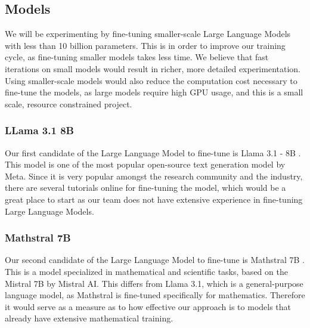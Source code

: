


\subsection{Models}
We will be experimenting by fine-tuning smaller-scale Large Language Models with less than 10 billion parameters. This is in order to improve our training cycle, as fine-tuning smaller models takes less time. We believe that fast iterations on small models would result in richer, more detailed experimentation. Using smaller-scale models would also reduce the computation cost necessary to fine-tune the models, as large models require high GPU usage, and this is a small scale, resource constrained project.

\subsubsection{LLama 3.1 8B}
Our first candidate of the Large Language Model to fine-tune is Llama 3.1 - 8B \cite{grattafiori2024llama}. This model is one of the most popular open-source text generation model by Meta. Since it is very popular amongst the research community and the industry, there are several tutorials online for fine-tuning the model, which would be a great place to start as our team does not have extensive experience in fine-tuning Large Language Models.

\subsubsection{Mathstral 7B}
Our second candidate of the Large Language Model to fine-tune is Mathstral 7B \cite{mistral2024mathstral}. This is a model specialized in mathematical and scientific tasks, based on the Mistral 7B by Mistral AI. This differs from Llama 3.1, which is a general-purpose language model, as Mathstral is fine-tuned specifically for mathematics. Therefore it would serve as a measure as to how effective our approach is to models that already have extensive mathematical training.